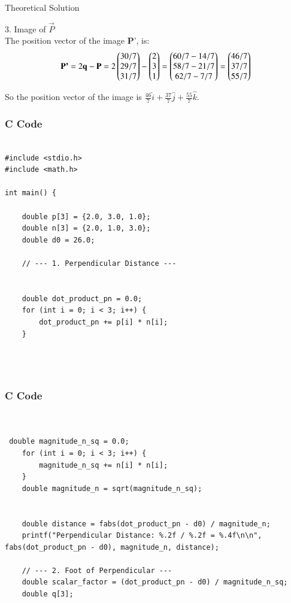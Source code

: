 \documentclass{beamer}
\begin{document}
\begin{frame}{Theoretical Solution}

3. Image of $ \vec{P}$\\

The position vector of the image $\textbf{P'}$, is:\\

\begin{align}
     \textbf{P'} = 2\textbf{q} - \textbf{P} = 2 \begin{pmatrix} 30/7 \\ 29/7 \\ 31/7 \end{pmatrix} - \begin{pmatrix} 2 \\ 3 \\ 1 \end{pmatrix} = \begin{pmatrix} 60/7 - 14/7 \\ 58/7 - 21/7 \\ 62/7 - 7/7 \end{pmatrix} = \begin{pmatrix} 46/7 \\ 37/7 \\ 55/7 \end{pmatrix}
\end{align}

So the position vector of the image is $\frac{46}{7}\hat{i} + \frac{37}{7}\hat{j} + \frac{55}{7}\hat{k}$.




\end{frame}




\begin{frame}[fragile]
    \frametitle{C Code }
    \begin{lstlisting}

#include <stdio.h>
#include <math.h>

int main() {
  
    double p[3] = {2.0, 3.0, 1.0};
    double n[3] = {2.0, 1.0, 3.0};
    double d0 = 26.0;

    // --- 1. Perpendicular Distance ---
    
   
    double dot_product_pn = 0.0;
    for (int i = 0; i < 3; i++) {
        dot_product_pn += p[i] * n[i];
    }

    
   

    \end{lstlisting}
\end{frame}

\begin{frame}[fragile]
    \frametitle{C Code }
    \begin{lstlisting}

    
 double magnitude_n_sq = 0.0;
    for (int i = 0; i < 3; i++) {
        magnitude_n_sq += n[i] * n[i];
    }
    double magnitude_n = sqrt(magnitude_n_sq);

   
    double distance = fabs(dot_product_pn - d0) / magnitude_n;
    printf("Perpendicular Distance: %.2f / %.2f = %.4f\n\n", fabs(dot_product_pn - d0), magnitude_n, distance);

    // --- 2. Foot of Perpendicular ---
    double scalar_factor = (dot_product_pn - d0) / magnitude_n_sq;
    double q[3];

   
    





    \end{lstlisting}
\end{frame}
\end{document}
